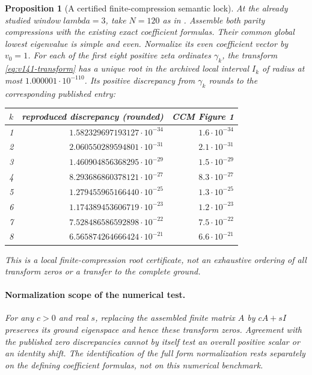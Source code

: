 \documentclass[11pt]{article}
\def\lambda{lambda}%
\newtheorem{proposition}[theorem]{Proposition}
\theoremstyle{remark}
\begin{document}
\begin{proposition}[A certified finite-compression semantic lock]
\label{prop:v141-ccm-lock}
At the already studied window $\lambda=3$, take $N=120$ as in
\cite[Section 6, Figure 1]{ConnesConsaniMoscovici2025}. Assemble
both parity compressions with the existing exact coefficient formulas.
Their common global lowest eigenvalue is simple and even. Normalize
its even coefficient vector by $v_0=1$. For each of the first eight
positive zeta ordinates $\gamma_k$, the transform
\eqref{eq:v141-transform} has a unique root in the archived local
interval $I_k$ of radius at most $1.000001\cdot10^{-110}$.
Its positive discrepancy from $\gamma_k$ rounds to the corresponding
published entry:
\begin{center}
\begin{tabular}{rrr}
\toprule
$k$ & reproduced discrepancy (rounded) & CCM Figure 1\\
\midrule
1 & $1.582329697193127\cdot10^{-34}$ & $1.6\cdot10^{-34}$\\
2 & $2.060550289594801\cdot10^{-31}$ & $2.1\cdot10^{-31}$\\
3 & $1.460904856368295\cdot10^{-29}$ & $1.5\cdot10^{-29}$\\
4 & $8.293686860378121\cdot10^{-27}$ & $8.3\cdot10^{-27}$\\
5 & $1.279455965166440\cdot10^{-25}$ & $1.3\cdot10^{-25}$\\
6 & $1.174389453606719\cdot10^{-23}$ & $1.2\cdot10^{-23}$\\
7 & $7.528486586592898\cdot10^{-22}$ & $7.5\cdot10^{-22}$\\
8 & $6.565874264666424\cdot10^{-21}$ & $6.6\cdot10^{-21}$\\
\bottomrule
\end{tabular}
\end{center}
This is a local finite-compression root certificate, not an exhaustive
ordering of all transform zeros or a transfer to the complete ground.

\paragraph{Normalization scope of the numerical test.}
For any $c>0$ and real $s$, replacing the assembled finite matrix
$A$ by $cA+sI$ preserves its ground eigenspace and hence these
transform zeros. Agreement with the published zero discrepancies
cannot by itself test an overall positive scalar or an identity shift.
The identification of the full form normalization rests separately on
the defining coefficient formulas, not on this numerical benchmark.
\end{proposition}
\end{document}
